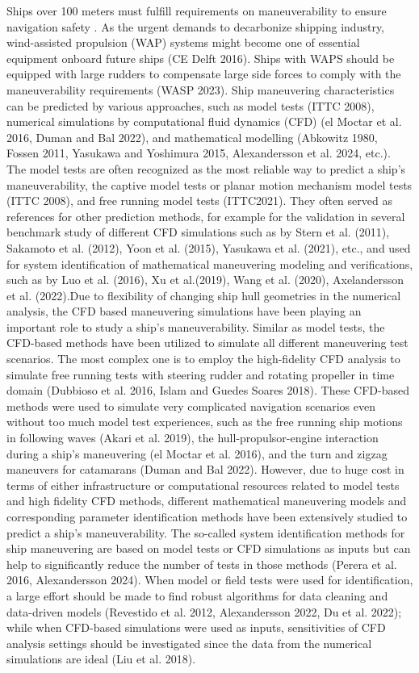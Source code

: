 Ships over 100 meters must fulfill requirements on maneuverability to ensure navigation safety \citep{imoStandardsShipManoeuvrability2002}. As the urgent demands to decarbonize shipping industry, wind-assisted propulsion (WAP) systems might become one of essential equipment onboard future ships (CE Delft 2016). Ships with WAPS should be equipped with large rudders to compensate large side forces to comply with the maneuverability requirements (WASP 2023). Ship maneuvering characteristics can be predicted by various approaches, such as model tests (ITTC 2008), numerical simulations by computational fluid dynamics (CFD) (el Moctar et al. 2016, Duman and Bal 2022), and mathematical modelling (Abkowitz 1980, Fossen 2011, Yasukawa and Yoshimura 2015,  Alexandersson et al. 2024, etc.). The model tests are often recognized as the most reliable way to predict a ship’s maneuverability, the captive model tests or planar motion mechanism model tests (ITTC 2008), and free running model tests (ITTC2021). They often served as references for other prediction methods, for example for the validation in several benchmark study of different CFD simulations such as by Stern et al. (2011), Sakamoto et al. (2012), Yoon et al. (2015), Yasukawa et al. (2021), etc., and used for system identification of mathematical maneuvering modeling and verifications, such as by Luo et al. (2016), Xu et al.(2019), Wang et al. (2020), Axelandersson et al. (2022).Due to flexibility of changing ship hull geometries in the numerical analysis, the CFD based maneuvering simulations have been playing an important role to study a ship’s maneuverability. Similar as model tests, the CFD-based methods have been utilized to simulate all different maneuvering test scenarios. The most complex one is to employ the high-fidelity CFD analysis to simulate free running tests with steering rudder and rotating propeller in time domain (Dubbioso et al. 2016, Islam and Guedes Soares 2018). These CFD-based methods were used to simulate very complicated navigation scenarios even without too much model test experiences, such as the free running ship motions in following waves (Akari et al. 2019), the hull-propulsor-engine interaction during a ship’s maneuvering (el Moctar et al. 2016), and the turn and zigzag maneuvers for catamarans (Duman and Bal 2022).
However, due to huge cost in terms of either infrastructure or computational resources related to model tests and high fidelity CFD methods, different mathematical maneuvering models and corresponding parameter identification methods have been extensively studied to predict a ship’s maneuverability. The so-called system identification methods for ship maneuvering are based on model tests or CFD simulations as inputs but can help to significantly reduce the number of tests in those methods (Perera et al. 2016, Alexandersson 2024). When model or field tests were used for identification, a large effort should be made to find robust algorithms for data cleaning and data-driven models (Revestido et al. 2012, Alexandersson 2022, Du et al. 2022); while when CFD-based simulations were used as inputs, sensitivities of CFD analysis settings should be investigated since the data from the numerical simulations are ideal (Liu et al. 2018).

